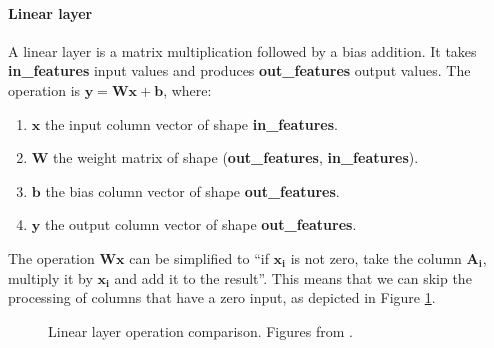 \paragraph[short]{Linear layer} A linear layer is a matrix multiplication followed by a bias addition. It takes \textbf{in\_features} input values and produces \textbf{out\_features} output values. The operation is $\bm{y} = \bm{W} \bm{x} + \bm{b}$, where:

\begin{enumerate}
\item $\bm{x}$ the input column vector of shape \textbf{in\_features}.
\item $\bm{W}$ the weight matrix of shape (\textbf{out\_features}, \textbf{in\_features}).
\item $\bm{b}$ the bias column vector of shape \textbf{out\_features}.
\item $\bm{y}$ the output column vector of shape \textbf{out\_features}.
\end{enumerate}

The operation $\bm{W} \bm{x}$ can be simplified to \enquote{if $\bm{x_i}$ is not zero, take the column $\bm{A_i}$, multiply it by $\bm{x_i}$ and add it to the result}. This means that we can skip the processing of columns that have a zero input, as depicted in Figure \ref{fig:linear_comparison}.

\begin{figure}[H]
\centering
{}%
\qquad
{}%
\caption{Linear layer operation comparison. Figures from \cite{nnue-pytorch}.}
\label{fig:linear_comparison}
\end{figure}

